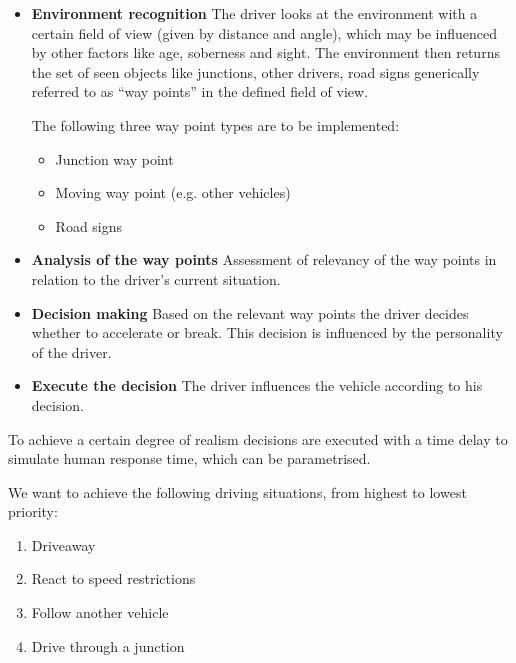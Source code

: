 \documentclass[a4paper,10pt,titlepage]{article}
\begin{document}
 \begin{itemize}
	\item \textbf{Environment recognition}\newline
				The driver looks at the environment with a certain field of view (given by distance and angle), which
				may be influenced by other factors like age, soberness and sight. The environment then returns the set 
				of seen objects like junctions, other drivers, road signs generically referred to as ``way points''
				in the defined field of view.

				The following three way point types are to be implemented:
				\begin{itemize}
					\item Junction way point
					\item Moving way point (e.g. other vehicles)
					\item Road signs
				\end{itemize}

	\item \textbf{Analysis of the way points}\newline
				Assessment of relevancy of the way points in relation to the driver's current situation.

	\item \textbf{Decision making}\newline
				Based on the relevant way points the driver decides whether to accelerate or break. This
				decision is influenced by the personality of the driver.

	\item \textbf{Execute the decision}\newline
				The driver influences the vehicle according to his decision.

 \end{itemize}

 To achieve a certain degree of realism decisions are executed with a time delay to simulate human response time,
 which can be parametrised.

 We want to achieve the following driving situations, from highest to lowest priority:
 \begin{enumerate}
	\item Driveaway
	\item React to speed restrictions
	\item Follow another vehicle
	\item Drive through a junction
 \end{enumerate}
\end{document}

